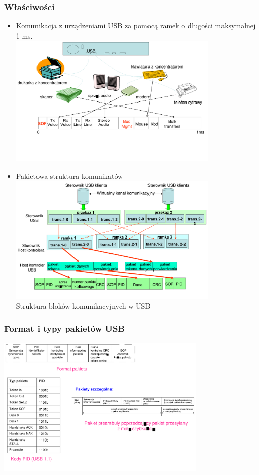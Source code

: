 	\subsubsection{Właściwości}
	\begin{itemize}
		\item Komunikacja z urządzeniami USB za pomocą ramek o długości maksymalnej 1 ms.\\
		\includegraphics[width=10cm]{./wyklady/USB_18_1.pdf}
		\item Pakietowa struktura komunikatów\\
		\includegraphics[width=10cm]{./wyklady/USB_19_1.pdf}\\
		Struktura bloków komunikacyjnych w USB
	\end{itemize}
	\subsubsection{Format i typy pakietów USB}
	\includegraphics[width=10cm]{./wyklady/USB_20_1.pdf}
